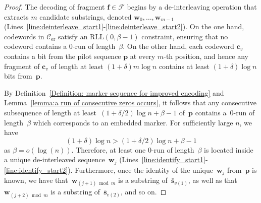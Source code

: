 \documentclass[journal,letterpaper,onecolumn,11pt]{IEEEtran}
\newcommand{\cC}{\mathcal{C}}
\newcommand{\cF}{\mathcal{F}}
\newcommand{\boldc}{\mathbf{c}}
\newcommand{\boldf}{\mathbf{f}}
\newcommand{\boldp}{\mathbf{p}}
\newcommand{\bolds}{\mathbf{s}}
\newcommand{\boldw}{\mathbf{w}}
\begin{document}
\begin{proof}
The decoding of fragment $\boldf\in \cF$ begins by a de-interleaving operation that extracts $m$ candidate substrings, denoted $\boldw_0,\ldots,\boldw_{m-1}$ (Lines~\ref{line:deinterleave_start1}-\ref{line:deinterleave_start2}). 
On the one hand, codewords in $\bar{\cC}_{\mathrm{er}}$ satisfy an $\text{RLL}(0,\beta-1)$ constraint, ensuring that no codeword contains a $0$-run of length~$\beta$. 
On the other hand, each codeword $\boldc_v$ contains a bit from the pilot sequence $\mathbf{p}$ at every $m$-th position, and hence any fragment of $\boldc_v$ of length at least $(1+\delta)m\log n$ contains at least $(1+\delta)\log n$ bits from~$\mathbf{p}$.

By Definition~\ref{Definition: marker sequence for improved encoding} and Lemma~\ref{lemma:a run of consecutive zeros occurs}, it follows that any consecutive subsequence of length at least~$(1+\delta/2)\log n+\beta-1$ of~$\boldp$ contains a~$0$-run of length~$\beta$ which corresponds to an embedded marker.
For sufficiently large $n$, we have $$(1+\delta)\log n>(1+\delta/2)\log n+\beta-1$$ as $\beta=o(\log(n))$.
Therefore, at least one $0$-run of length~$\beta$ is located inside a unique de-interleaved sequence~$\boldw_j$ (Lines~\ref{line:identify_start1}-\ref{line:identify_start2}).
Furthermore, once the identity of the unique~$\boldw_j$ from~$\boldp$ is known, we have that~$\boldw_{(j+1)\bmod m}$ is a substring of~$\bar{\bolds}_{v(1)}$, as well as that $\boldw_{(j+2)\bmod m}$ is a substring of~$\bar{\bolds}_{v(2)}$, and so on.
\end{proof}
\end{document}
